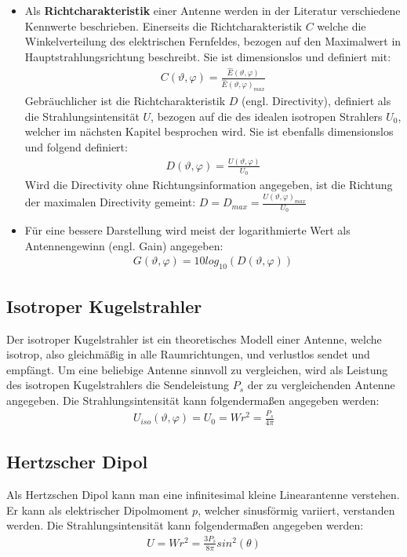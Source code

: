 \begin{itemize}
\item Als \textbf{Richtcharakteristik} einer Antenne werden in der Literatur verschiedene Kennwerte beschrieben. Einerseits die Richtcharakteristik \textbf{$C$} welche die Winkelverteilung des elektrischen Fernfeldes, bezogen auf den Maximalwert in Hauptstrahlungsrichtung beschreibt. Sie ist dimensionslos und definiert mit:
\begin{align*}
C\left(\vartheta,\varphi \right) = \frac{\hat{E}\left(\vartheta,\varphi \right) }{\hat{E}\left(\vartheta,\varphi \right)_{max}}
\end{align*} 
\newline
Gebräuchlicher ist die Richtcharakteristik \textbf{$D$} (engl. Directivity), definiert als die Strahlungsintensität $U$, bezogen auf die des idealen isotropen Strahlers $U_0$, welcher im nächsten Kapitel besprochen wird. Sie ist ebenfalls dimensionslos und folgend definiert:
\begin{align*}
D\left(\vartheta,\varphi \right) = \frac{U\left(\vartheta,\varphi \right)}{U_0}
\end{align*}
\newline
Wird die Directivity ohne Richtungsinformation angegeben, ist die Richtung der maximalen Directivity gemeint: $D=D_{max}=\frac{U\left(\vartheta,\varphi \right)_{max}}{U_0}$
\item Für eine bessere Darstellung wird meist der logarithmierte Wert als Antennengewinn (engl. Gain) angegeben:
\begin{align*}
G\left(\vartheta,\varphi \right) =10log_{10}\left(D\left(\vartheta,\varphi \right)  \right)
\end{align*}

\end{itemize}



\subsection{Isotroper Kugelstrahler}
Der isotroper Kugelstrahler ist ein theoretisches Modell einer Antenne, welche isotrop, also gleichmäßig in alle Raumrichtungen, und verlustlos sendet und empfängt. Um eine beliebige Antenne sinnvoll zu vergleichen, wird als Leistung des isotropen Kugelstrahlers die Sendeleistung $P_{s}$ der zu vergleichenden Antenne angegeben. Die Strahlungsintensität kann folgendermaßen angegeben werden:
\begin{align}
U_{iso}\left(\vartheta,\varphi \right) =U_0=Wr^2=\frac{P_s}{4 \pi }
\end{align}

\subsection{Hertzscher Dipol}
Als Hertzschen Dipol kann man eine infinitesimal kleine Linearantenne verstehen. Er kann als elektrischer Dipolmoment $p$, welcher sinusförmig variiert, verstanden werden. Die Strahlungsintensität kann folgendermaßen angegeben werden:
\begin{align}
U=Wr^2=\frac{3P_s}{8\pi}sin^2\left( \theta \right)
\end{align}
